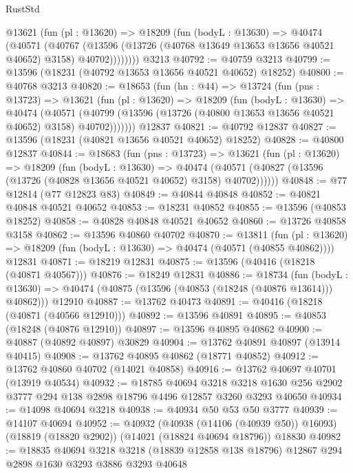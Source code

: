 \begin{lexlean}{RustStd}
\begin{coremodule}
        @13621
          (fun (pl : @13620) =>
          @18209
            (fun (bodyL : @13630) =>
            @40474
              (@40571
                (@40767
                  (@13596 (@13726 (@40768 @13649 @13653 @13656 @40521 @40652) @3158) @40702))))))))
    @3213
@40792 := @40759 @3213
@40799 := @13596 (@18231 (@40792 @13653 @13656 @40521 @40652) @18252)
@40800 := @40768 @3213
@40820 := @18653
    (fun (hn : @44) =>
    @13724
      (fun (pns : @13723) =>
      @13621
        (fun (pl : @13620) =>
        @18209
          (fun (bodyL : @13630) =>
          @40474
            (@40571
              (@40799 (@13596 (@13726 (@40800 @13653 @13656 @40521 @40652) @3158) @40702)))))))
    @12837
@40821 := @40792 @12837
@40827 := @13596 (@18231 (@40821 @13656 @40521 @40652) @18252)
@40828 := @40800 @12837
@40844 := @18683
    (fun (pns : @13723) =>
    @13621
      (fun (pl : @13620) =>
      @18209
        (fun (bodyL : @13630) =>
        @40474 (@40571 (@40827 (@13596 (@13726 (@40828 @13656 @40521 @40652) @3158) @40702))))))
@40848 := @77 @12814 (@77 @12823 @83)
@40849 := @40844 @40848
@40852 := @40821 @40848 @40521 @40652
@40853 := @18231 @40852
@40855 := @13596 (@40853 @18252)
@40858 := @40828 @40848 @40521 @40652
@40860 := @13726 @40858 @3158
@40862 := @13596 @40860 @40702
@40870 := @13811
    (fun (pl : @13620) => @18209 (fun (bodyL : @13630) => @40474 (@40571 (@40855 @40862))))
    @12831
@40871 := @18219 @12831
@40875 := @13596 (@40416 (@18218 (@40871 @40567)))
@40876 := @18249 @12831
@40886 := @18734
    (fun (bodyL : @13630) => @40474 (@40875 (@13596 (@40853 (@18248 (@40876 @13614))) @40862)))
    @12910
@40887 := @13762 @40473
@40891 := @40416 (@18218 (@40871 (@40566 @12910)))
@40892 := @13596 @40891
@40895 := @40853 (@18248 (@40876 @12910))
@40897 := @13596 @40895 @40862
@40900 := @40887 (@40892 @40897) @30829
@40904 := @13762 @40891 @40897 (@13914 @40415)
@40908 := @13762 @40895 @40862 (@18771 @40852)
@40912 := @13762 @40860 @40702 (@14021 @40858)
@40916 := @13762 @40697 @40701 (@13919 @40534)
@40932 := @18785
    @40694
    @3218
    @3218
    @1630
    @256
    @2902
    @3777
    @294
    @138
    @2898
    @18796
    @4496
    @12857
    @3260
    @3293
    @40650
@40934 := @14098 @40694 @3218
@40938 := @40934 @50 @53 @50 @3777
@40939 := @14107 @40694
@40952 := @40932
    (@40938 (@14106 (@40939 @50)) @16093)
    (@18819 (@18820 @2902))
    (@14021 (@18824 @40694 @18796))
    @18830
@40982 := @18835
    @40694
    @3218
    @3218
    (@18839 @12858 @138 @18796)
    @12867
    @294
    @2898
    @1630
    @3293
    @3886
    @3293
    @40648

\end{coremodule}
\end{lexlean}
